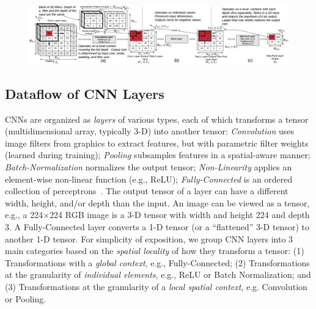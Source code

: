\begin{figure}[t]
\vspace{-2mm}
\includegraphics[width=\textwidth]{images/cnn_simplified}
\vspace{-6mm}
\caption{}
\vspace{-2mm}
\label{fig:cnn_simplified}
\end{figure}

\subsection{Dataflow of CNN Layers}\label{sec:cnn_internals}
CNNs are organized as \textit{layers} of various types, each of which transforms a tensor (multidimensional array, typically 3-D) into another tensor: \textit{Convolution} uses image filters from graphics to extract features, but with parametric filter weights (learned during training); \textit{Pooling} subsamples features in a spatial-aware manner; \textit{Batch-Normalization} normalizes the output tensor; \textit{Non-Linearity} applies an element-wise non-linear function (e.g., ReLU); \textit{Fully-Connected} is an ordered collection of perceptrons~\cite{dlbook}. The output tensor of a layer can have a different width, height, and/or depth than the input. An image can be viewed as a tensor, e.g., a 224$\times$224 RGB image is a 3-D tensor with width and height 224 and depth 3. A Fully-Connected layer converts a 1-D tensor (or a ``flattened'' 3-D tensor) to another 1-D tensor. For simplicity of exposition, we group CNN layers into 3 main categories based on the \textit{spatial locality} of how they transform a tensor: (1) Transformations with a \textit{global context}, e.g., Fully-Connected; (2) Transformations at the granularity of \textit{individual elements}, e.g., ReLU or Batch Normalization; and (3) Transformations at the granularity of a \textit{local spatial context}, e.g. Convolution or Pooling.

